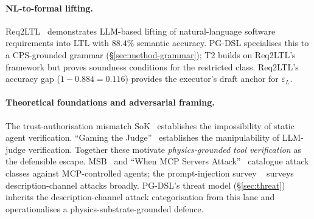 \paragraph{NL-to-formal lifting.}
Req2LTL~\cite{req2ltl} demonstrates LLM-based lifting of
natural-language software requirements into LTL with $88.4\%$ semantic
accuracy. PG-DSL specialises this to a CPS-grounded grammar
(\S\ref{sec:method-grammar}); T2 builds on Req2LTL's framework but
proves soundness conditions for the restricted class. Req2LTL's
accuracy gap ($1 - 0.884 = 0.116$) provides the executor's draft
anchor for $\varepsilon_L$.

\paragraph{Theoretical foundations and adversarial framing.}
The trust-authorisation mismatch SoK~\cite{trust_auth_sok} establishes
the impossibility of static agent verification.
``Gaming the Judge''~\cite{gaming_judge} establishes the
manipulability of LLM-judge verification. Together these motivate
\emph{physics-grounded tool verification} as the defensible escape.
MSB~\cite{msb_mcp_bench} and ``When MCP Servers
Attack''~\cite{when_mcp_attack} catalogue attack classes against
MCP-controlled agents; the prompt-injection survey
~\cite{prompt_inj_survey} surveys
description-channel attacks broadly. PG-DSL's threat model
(\S\ref{sec:threat}) inherits the description-channel attack
categorisation from this lane and operationalises a
physics-substrate-grounded defence.

